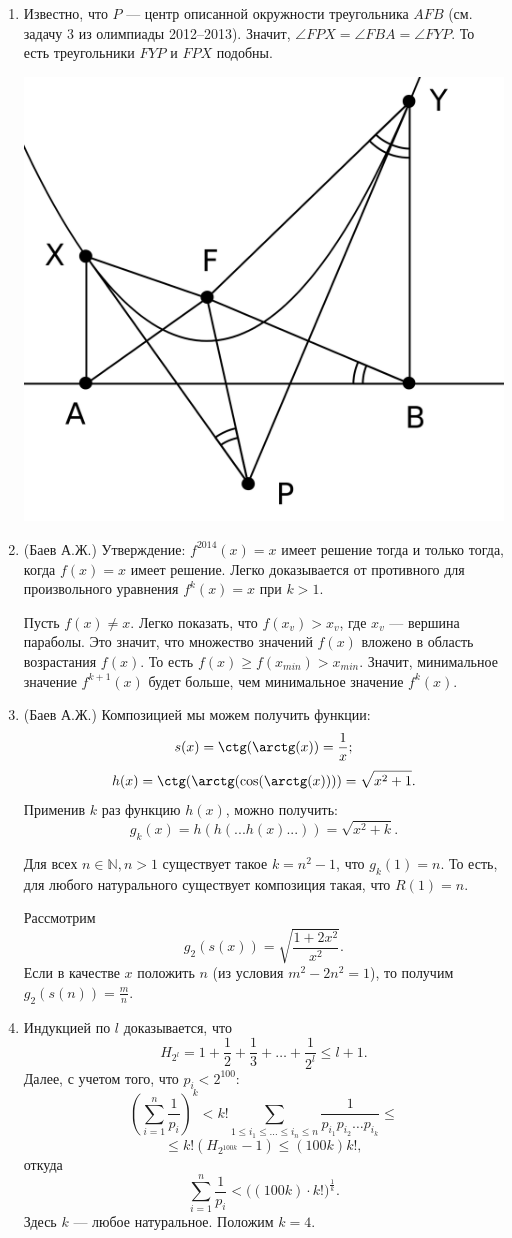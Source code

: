 \begin{enumerate}
\item Известно, что $P$ --- центр описанной окружности треугольника $AFB$ (см. задачу 3 из олимпиады 2012--2013). Значит, $\angle FPX = \angle FBA = \angle FYP$. То есть треугольники $FYP$  и $FPX$ подобны.
\begin{center}
\includegraphics[width=0.5\linewidth]{pictures/2013-2014-bonus-6}
\end{center}

\item (Баев А.Ж.) Утверждение: $f^{2014}(x) = x$ имеет решение тогда и только тогда, когда $f(x) = x$ имеет решение. Легко доказывается от противного для произвольного уравнения $f^k(x) = x$ при $k>1$.

Пусть $f(x) \neq x$. Легко показать, что $f(x_v) > x_v$, где $x_v$ --- вершина параболы. Это значит, что множество значений $f(x)$ вложено в область возрастания $f(x)$. То есть $f(x) \geqslant f(x_{min}) > x_{min}$. Значит, минимальное значение $f^{k+1}(x)$ будет больше, чем минимальное значение $f^{k}(x)$.

\item (Баев А.Ж.) Композицией мы можем получить функции:
$$s(x) = \ctg (\arctg (x) ) = \frac{1}{x};$$
$$h(x) = \ctg (\arctg ( \cos ( \arctg(x) ) ) ) = \sqrt{x^2+1}.$$
Применив $k$ раз функцию $h(x)$, можно получить:
$$g_k(x) = h(h( ... h(x) ... )) = \sqrt{x^2 + k}.$$

Для всех $n \in \mathbb{N}, n > 1$ существует такое $k = n^2-1$, что $g_k(1) = n$. То есть, для любого натурального существует композиция такая, что  $R(1) = n$.

Рассмотрим 
$$g_2(s(x)) = \sqrt{\frac{1+2x^2}{x^2}}.$$
Если в качестве $x$ положить $n$ (из условия $m^2 - 2n^2 = 1$), то получим $g_2(s(n)) = \frac{m}{n}$.

\item Индукцией по $l$ доказывается, что
$$H_{2^l} = 1 + \frac{1}{2} + \frac{1}{3} + \hdots + \frac{1}{2^l} \leqslant l + 1.$$
Далее, с учетом того, что $p_i < 2^{100}$:
$$\left( \sum_{i=1}^{n} \frac{1}{p_i} \right)^k < k! \sum_{1 \leqslant i_1 \leqslant \hdots \leqslant i_n \leqslant n} \frac{1}{p_{i_1} p_{i_2} \hdots p_{i_k}} \leqslant $$
$$ \leqslant k! ( H_{2^{100k}} - 1) \leqslant (100 k) k!,$$
откуда
$$\sum_{i=1}^{n} \frac{1}{p_i} < \bigl( (100 k) \cdot k! \bigr) ^{\frac{1}{k}}.$$
Здесь $k$ --- любое натуральное. Положим $k = 4$.
\end{enumerate}

